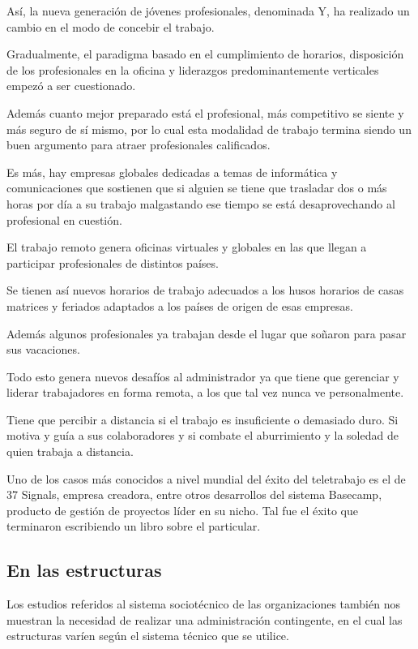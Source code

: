 \documentclass[a4paper, 12pt]{article}
\begin{document}
Así, la nueva generación de jóvenes profesionales, denominada Y, ha realizado un cambio en el modo de concebir el trabajo.

Gradualmente, el paradigma basado en el cumplimiento de horarios, disposición de los profesionales en la oficina y liderazgos predominantemente verticales empezó a ser cuestionado. 

Además cuanto mejor preparado está el profesional, más competitivo se siente y más seguro de sí mismo, por lo cual esta modalidad de trabajo termina siendo un buen argumento para atraer profesionales calificados.

Es más, hay empresas globales dedicadas a temas de informática y comunicaciones que sostienen que si alguien se tiene que trasladar dos o más horas por día a su trabajo malgastando ese tiempo se está desaprovechando al profesional en cuestión.

El trabajo remoto genera oficinas virtuales y globales en las que llegan a participar profesionales de distintos países. 

Se tienen así nuevos horarios de trabajo adecuados a los husos horarios de casas matrices y feriados adaptados a los países de origen de esas empresas. 

Además algunos profesionales ya trabajan desde el lugar que soñaron para pasar sus vacaciones.

Todo esto genera nuevos desafíos al administrador ya que tiene que gerenciar y liderar trabajadores en forma remota, a los que tal vez nunca ve personalmente.

Tiene que percibir a distancia si el trabajo es insuficiente o demasiado duro. Si motiva y guía a sus colaboradores y si combate el aburrimiento y la soledad de quien trabaja a distancia.

Uno de los casos más conocidos a nivel mundial del éxito del teletrabajo es el de 37 Signals, empresa creadora, entre otros desarrollos del sistema Basecamp, producto de gestión de proyectos líder en su nicho. Tal fue el éxito que terminaron escribiendo un libro sobre el particular\cite{FriedHansson2013}.

\subsection{En las estructuras}
Los estudios referidos al sistema sociotécnico de las organizaciones también nos muestran la necesidad de realizar una administración contingente, en el cual las estructuras varíen según el sistema técnico que se utilice.
\end{document}
